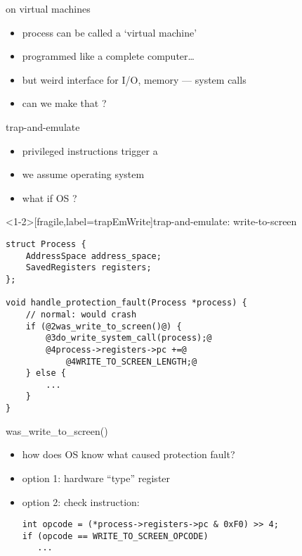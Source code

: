 \begin{frame}{on virtual machines}
\begin{itemize}
    \item process can be called a `virtual machine'
    \item programmed like a complete computer\ldots{}
    \vspace{.5cm}
    \item<2-> but weird interface for I/O, memory --- system calls
    \item<2-> can we make that ?
\end{itemize}
\end{frame}

\begin{frame}{trap-and-emulate}
\begin{itemize}
    \item privileged instructions trigger a 
    \item we assume operating system 
    \vspace{.5cm}
    \item what if OS ?
\end{itemize}
\end{frame}

\begin{frame}<1-2>[fragile,label=trapEmWrite]{trap-and-emulate: write-to-screen}
\begin{lstlisting}
struct Process {
    AddressSpace address_space;
    SavedRegisters registers;
};

void handle_protection_fault(Process *process) {
    // normal: would crash
    if (@2was_write_to_screen()@) {
        @3do_write_system_call(process);@
        @4process->registers->pc +=@
            @4WRITE_TO_SCREEN_LENGTH;@
    } else {
        ...
    }
}
\end{lstlisting}
\end{frame}

\begin{frame}[fragile,label=wasWriteToScreen]{was\_write\_to\_screen()}
\lstset{
    language=C,
    style=small,
}
\begin{itemize}
    \item how does OS know what caused protection fault?
    \item option 1: hardware ``type'' register
    \item option 2: check instruction:
\begin{lstlisting}
int opcode = (*process->registers->pc & 0xF0) >> 4;
if (opcode == WRITE_TO_SCREEN_OPCODE) 
   ...
\end{lstlisting}
\end{itemize} 
\end{frame}

